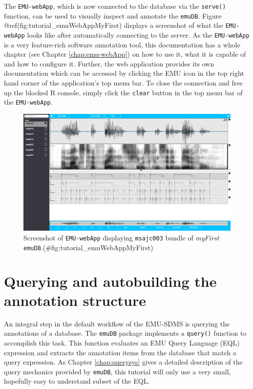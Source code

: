 \documentclass[]{book}
\theoremstyle{definition}
\theoremstyle{definition}
\theoremstyle{definition}
\theoremstyle{remark}
\begin{document}
The \texttt{EMU-webApp}, which is now connected to the database via the
\texttt{serve()} function, can be used to visually inspect and annotate
the \texttt{emuDB}. Figure @ref(fig:tutorial\_emuWebAppMyFirst) displays
a screenshot of what the \texttt{EMU-webApp} looks like after
automatically connecting to the server. As the \texttt{EMU-webApp} is a
very feature-rich software annotation tool, this documentation has a
whole chapter (see Chapter \ref{chap:emu-webApp}) on how to use it, what
it is capable of and how to configure it. Further, the web application
provides its own documentation which can be accessed by clicking the EMU
icon in the top right hand corner of the application's top menu bar. To
close the connection and free up the blocked R console, simply click the
\texttt{clear} button in the top menu bar of the \texttt{EMU-webApp}.

\begin{figure}
\centering
\includegraphics{pics/tutorialEmuWebAppMyFirst.png}
\caption{Screenshot of \texttt{EMU-webApp} displaying \texttt{msajc003}
bundle of \emph{myFirst}
\texttt{emuDB}.(\#fig:tutorial\_emuWebAppMyFirst)}
\end{figure}

\section{Querying and autobuilding the annotation
structure}\label{querying-and-autobuilding-the-annotation-structure}

An integral step in the default workflow of the EMU-SDMS is querying the
annotations of a database. The \texttt{emuDB} package implements a
\texttt{query()} function to accomplish this task. This function
evaluates an EMU Query Language (EQL) expression and extracts the
annotation items from the database that match a query expression. As
Chapter \ref{chap:querysys} gives a detailed description of the query
mechanics provided by \texttt{emuDB}, this tutorial will only use a very
small, hopefully easy to understand subset of the EQL.
\end{document}
